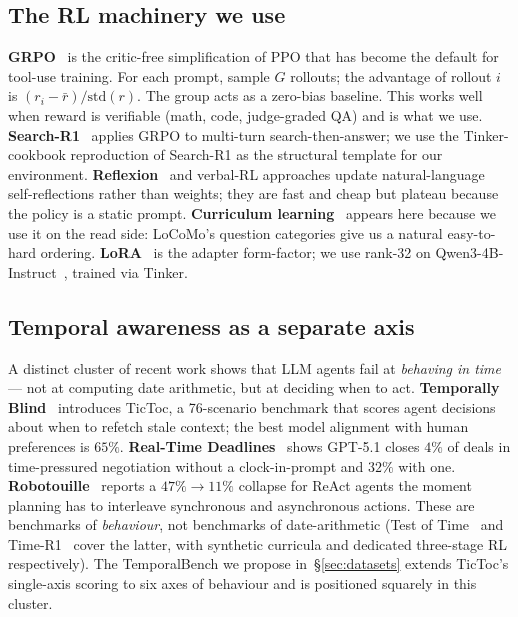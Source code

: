 \documentclass[11pt]{article}
\begin{document}
\subsection{The RL machinery we use}

\textbf{GRPO}~\cite{shao2024deepseekmath} is the critic-free
simplification of PPO that has become the default for tool-use
training. For each prompt, sample $G$ rollouts; the advantage of
rollout $i$ is $(r_i - \bar{r})/\mathrm{std}(r)$. The group acts as a
zero-bias baseline. This works well when reward is verifiable (math,
code, judge-graded QA) and is what we use.
\textbf{Search-R1}~\cite{jin2025searchr1} applies GRPO to multi-turn
search-then-answer; we use the Tinker-cookbook reproduction of
Search-R1 as the structural template for our environment.
\textbf{Reflexion}~\cite{shinn2023reflexion} and verbal-RL approaches
update natural-language self-reflections rather than weights; they are
fast and cheap but plateau because the policy is a static prompt.
\textbf{Curriculum learning}~\cite{bengio2009curriculum} appears here
because we use it on the read side: LoCoMo's question categories give
us a natural easy-to-hard ordering. \textbf{LoRA}~\cite{hu2021lora} is
the adapter form-factor; we use rank-32 on
Qwen3-4B-Instruct~\cite{tinker2025}, trained via Tinker.

\subsection{Temporal awareness as a separate axis}

A distinct cluster of recent work shows that LLM agents fail at
\emph{behaving in time} --- not at computing date arithmetic, but at
deciding when to act. \textbf{Temporally Blind}~\cite{tictoc2025}
introduces TicToc, a 76-scenario benchmark that scores agent decisions
about when to refetch stale context; the best model alignment with
human preferences is $65\%$. \textbf{Real-Time
Deadlines}~\cite{realtimedeadlines2026} shows GPT-5.1 closes $4\%$ of
deals in time-pressured negotiation without a clock-in-prompt and
$32\%$ with one. \textbf{Robotouille}~\cite{robotouille2025} reports a
$47\% \to 11\%$ collapse for ReAct agents the moment planning has to
interleave synchronous and asynchronous actions. These are
benchmarks of \emph{behaviour}, not benchmarks of date-arithmetic
(Test of Time~\cite{testoftime2024} and Time-R1~\cite{timer1_2025}
cover the latter, with synthetic curricula and dedicated three-stage
RL respectively). The TemporalBench we propose
in~\S\ref{sec:datasets} extends TicToc's single-axis scoring to six
axes of behaviour and is positioned squarely in this cluster.
\end{document}
